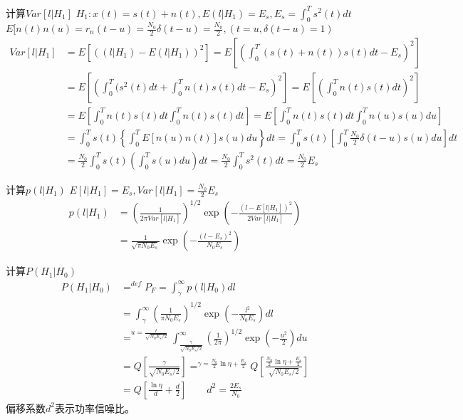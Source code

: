 \begin{frame}{计算$Var[l|H_1]$}
$H_1:x(t)=s(t)+n(t), E(l|H_1)=E_s,E_s=\int_{0}^{T}s^2(t)dt$\\
$E[n(t)n(u)=r_n(t-u)=\frac{N_0}{2}\delta(t-u)=\frac{N_0}{2},(t=u,\delta(t-u)=1)$
\begin{align*}
Var[l|H_1]&=E[((l|H_1)-E(l|H_1))^2]=E\left[\left(\int_{0}^{T}(s(t)+n(t))s(t)dt-E_s\right)^2\right]\\
&=E\left[\left(\int_{0}^{T}(s^2(t)dt+\int_{0}^{T}n(t)s(t)dt-E_s\right)^2\right]=E\left[\left(\int_{0}^{T}n(t)s(t)dt\right)^2\right]\\
&=E\left[\int_{0}^{T}n(t)s(t)dt\int_{0}^{T}n(t)s(t)dt\right]=E\left[\int_{0}^{T}n(t)s(t)dt\int_{0}^{T}n(u)s(u)du\right]\\
&=\int_{0}^{T}s(t)\left\{\int_{0}^{T}E[n(u)n(t)]s(u)du\right\}dt=\int_{0}^{T}s(t)\left[\int_{0}^{T}\frac{N_0}{2}\delta(t-u)s(u)du\right]dt\\
&=\frac{N_0}{2}\int_{0}^{T}s(t)\left(\int_{0}^{T}s(u)du\right)dt=\frac{N_0}{2}\int_{0}^{T}s^2(t)dt=\frac{N_0}{2}E_s
\end{align*}
\end{frame}

\begin{frame}{计算$p(l|H_1)$}
$E[l|H_1]=E_s,Var[l|H_1]=\frac{N_0}{2}E_s$
\begin{align*}
p(l|H_1)&=\left(\frac{1}{2\pi Var[l|H_1]}\right)^{1/2}\exp\left(-\frac{(l-E[l|H_1])^2}{2Var[l|H_1]}\right)\\
&=\frac{1}{\sqrt{\pi N_0E_s}}\exp\left(-\frac{(l-E_s)^2}{N_0E_s}\right)
\end{align*}
\end{frame}

\begin{frame}{计算$P(H_1|H_0)$}
\begin{align*}
P(H_1|H_0)&\mathop{=}^{def}P_F=\int_{\gamma}^{\infty}p(l|H_0)dl\\
&=\int_{\gamma}^{\infty}\left(\frac{1}{\pi N_0E_s}\right)^{1/2}\exp\left(-\frac{l^2}{N_0E_s}\right)dl\\
&\mathop{=}^{u=\frac{l}{\sqrt{N_0E_s/2}}}\int_{\frac{\gamma}{\sqrt{N_0E_s/2}}}^{\infty}\left(\frac{1}{2\pi}\right)^{1/2}\exp\left(-\frac{u^2}{2}\right)du\\
&=Q\left[\frac{\gamma}{\sqrt{N_0E_s/2}}\right]\mathop{=}^{\gamma=\frac{N_0}{2}\ln\eta+\frac{E_s}{2}}Q\left[\frac{\frac{N_0}{2}\ln\eta+\frac{E_s}{2}}{\sqrt{N_0E_s/2}}\right]\\
&=Q\left[\frac{\ln\eta}{d}+\frac{d}{2}\right]\qquad d^2=\frac{2E_s}{N_0}
\end{align*}
偏移系数$d^2$表示功率信噪比。
\end{frame}

